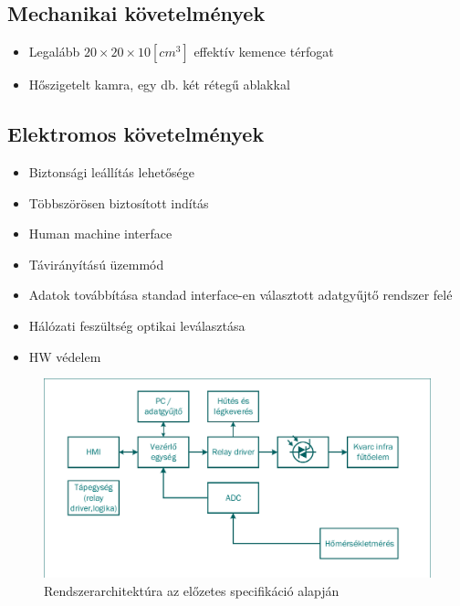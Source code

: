 \documentclass[11pt]{article} %
\begin{document}
\subsection{Mechanikai követelmények}
\begin{itemize}
\item Legalább $20\times20\times10 [cm^3]$ effektív kemence térfogat
\item Hőszigetelt kamra, egy db. két rétegű ablakkal
\end{itemize}


\subsection{Elektromos követelmények}
\begin{itemize}
\item Biztonsági leállítás lehetősége
\item Többszörösen biztosított indítás
\item Human machine interface
\item Távirányítású üzemmód
\item Adatok továbbítása standad interface-en választott adatgyűjtő rendszer felé
\item Hálózati feszültség optikai leválasztása
\item HW védelem
\end{itemize}

\begin{figure}[hbt!]
 \centering
 \includegraphics[width=1.0\textwidth]{spec_v10}
 \caption{Rendszerarchitektúra az előzetes specifikáció alapján}
\end{figure}
\end{document}

